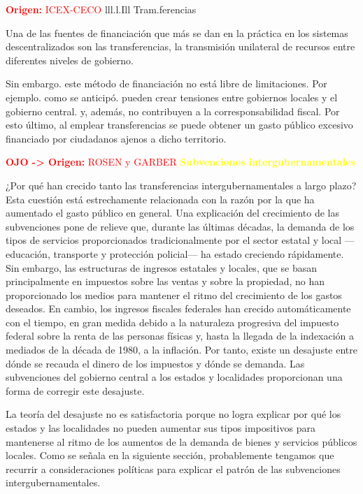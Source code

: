 \documentclass[10pt,a4paper]{article}
\begin{document}
\textcolor{red}{\textbf{Origen:} ICEX-CECO}
lll.l.Ill Tram.ferencias

Una de las fuentes de financiación que más se dan en la práctica en los sistemas descentralizados son las transferencias, la transmisión unilateral de recursos entre diferentes niveles de gobierno.

Sin embargo. este método de financiación no está libre de limitaciones. Por ejemplo. como se anticipó. pueden crear tensiones entre gobiernos locales y el gobierno central. y, además, no contribuyen a la corresponsabilidad fiscal. Por esto último, al emplear transferencias se puede obtener un gasto público excesivo financiado por ciudadanos ajenos a dicho territorio.


\textcolor{red}{\textbf{OJO -> Origen:} ROSEN y GARBER}
\textcolor{yellow}{\textbf{Subvenciones intergubernamentales}}

¿Por qué han crecido tanto las transferencias intergubernamentales a largo plazo? Esta cuestión está estrechamente relacionada con la razón por la que ha aumentado el gasto público en general. Una explicación del crecimiento de las subvenciones pone de relieve que, durante las últimas décadas, la demanda de los tipos de servicios proporcionados tradicionalmente por el sector estatal y local —educación, transporte y protección policial— ha estado creciendo rápidamente. Sin embargo, las estructuras de ingresos estatales y locales, que se basan principalmente en impuestos sobre las ventas y sobre la propiedad, no han proporcionado los medios para mantener el ritmo del crecimiento de los gastos deseados. En cambio, los ingresos fiscales federales han crecido automáticamente con el tiempo, en gran medida debido a la naturaleza progresiva del impuesto federal sobre la renta de las personas físicas y, hasta la llegada de la indexación a mediados de la década de 1980, a la inflación. Por tanto, existe un desajuste entre dónde se recauda el dinero de los impuestos y dónde se demanda. Las subvenciones del gobierno central a los estados y localidades proporcionan una forma de corregir este desajuste.

La teoría del desajuste no es satisfactoria porque no logra explicar por qué los estados y las localidades no pueden aumentar sus tipos impositivos para mantenerse al ritmo de los aumentos de la demanda de bienes y servicios públicos locales. Como se señala en la siguiente sección, probablemente tengamos que recurrir a consideraciones políticas para explicar el patrón de las subvenciones intergubernamentales.
\end{document}
